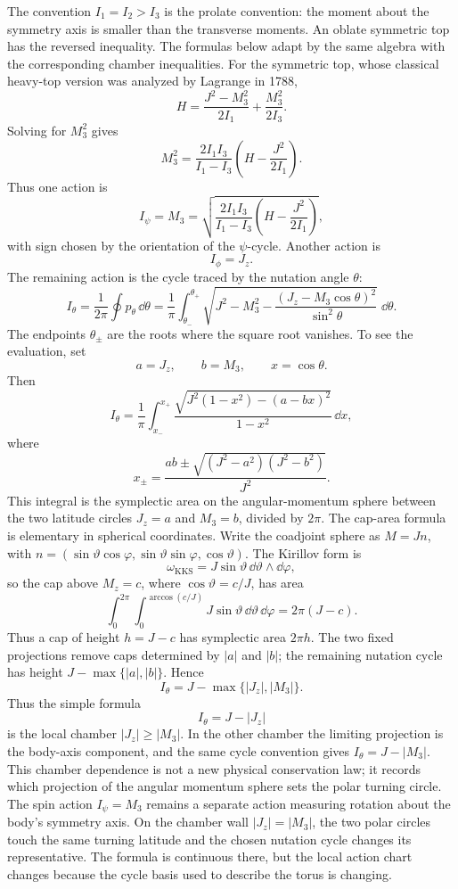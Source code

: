 The convention \(I_1=I_2>I_3\) is the prolate convention: the moment about the
symmetry axis is smaller than the transverse moments. An oblate symmetric top
has the reversed inequality. The formulas below adapt by the same algebra with
the corresponding chamber inequalities. For the symmetric top, whose classical
heavy-top version was analyzed by Lagrange in 1788,
\[
  H
  =
  \frac{J^2-M_3^2}{2I_1}
  +
  \frac{M_3^2}{2I_3}.
\]
Solving for \(M_3^2\) gives
\[
  M_3^2
  =
  \frac{2I_1I_3}{I_1-I_3}
  \left(
    H-\frac{J^2}{2I_1}
  \right).
\]
Thus one action is
\[
  I_\psi=M_3
  =
  \sqrt{
  \frac{2I_1I_3}{I_1-I_3}
  \left(
    H-\frac{J^2}{2I_1}
  \right)
  },
\]
with sign chosen by the orientation of the \(\psi\)-cycle. Another action is
\[
  I_\phi=J_z.
\]
The remaining action is the cycle traced by the nutation angle \(\theta\):
\[
  I_\theta
  =
  \frac1{2\pi}\oint p_\theta\,\dd\theta
  =
  \frac1\pi\int_{\theta_-}^{\theta_+}
  \sqrt{
    J^2-M_3^2
    -
    \frac{(J_z-M_3\cos\theta)^2}{\sin^2\theta}
  }\;\dd\theta .
\]
The endpoints \(\theta_\pm\) are the roots where the square root vanishes.
To see the evaluation, set
\[
  a=J_z,\qquad b=M_3,\qquad x=\cos\theta .
\]
Then
\[
  I_\theta
  =
  \frac1\pi\int_{x_-}^{x_+}
  \frac{\sqrt{J^2(1-x^2)-(a-bx)^2}}{1-x^2}\,\dd x,
\]
where
\[
  x_\pm=
  \frac{ab\pm\sqrt{(J^2-a^2)(J^2-b^2)}}{J^2}.
\]
This integral is the symplectic area on the angular-momentum sphere between
the two latitude circles \(J_z=a\) and \(M_3=b\), divided by \(2\pi\). The
cap-area formula is elementary in spherical coordinates. Write the coadjoint
sphere as \(M=Jn\), with
\(n=(\sin\vartheta\cos\varphi,\sin\vartheta\sin\varphi,\cos\vartheta)\).
The Kirillov form is
\[
  \omega_{\mathrm{KKS}}=J\sin\vartheta\,\dd\vartheta\wedge\dd\varphi,
\]
so the cap above \(M_z=c\), where \(\cos\vartheta=c/J\), has area
\[
  \int_0^{2\pi}\int_0^{\arccos(c/J)}
  J\sin\vartheta\,\dd\vartheta\,\dd\varphi
  =
  2\pi(J-c).
\]
Thus a cap of height \(h=J-c\) has symplectic area \(2\pi h\). The two fixed
projections remove caps determined by \(|a|\) and \(|b|\); the remaining
nutation cycle has height \(J-\max\{|a|,|b|\}\). Hence
\[
  \boxed{
  I_\theta=J-\max\{|J_z|,|M_3|\}.
  }
\]
Thus the simple formula
\[
  I_\theta=J-|J_z|
\]
is the local chamber \(|J_z|\ge |M_3|\). In the other chamber the limiting
projection is the body-axis component, and the same cycle convention gives
\(I_\theta=J-|M_3|\). This chamber dependence is not a new physical
conservation law; it records which projection of the angular momentum sphere
sets the polar turning circle. The spin action \(I_\psi=M_3\) remains a
separate action measuring rotation about the body's symmetry axis.
On the chamber wall \(|J_z|=|M_3|\), the two polar circles touch the same
turning latitude and the chosen nutation cycle changes its representative. The
formula is continuous there, but the local action chart changes because the
cycle basis used to describe the torus is changing.

